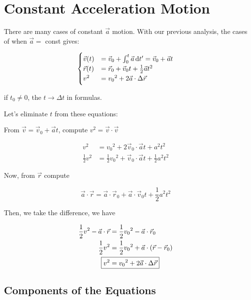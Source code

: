 \section{Constant Acceleration Motion}

There are many cases of constant $\vec a$ motion. With our previous analysis, the cases of when $\vec a =$ const gives:

\begin{equation}
	\begin{cases}
		\vec v(t) &= \vec v_0 + \int_0^t \vec a \D t' = \vec v_0 + \vec a t\\
		\vec r(t) &= \vec r_0 + \vec v_0 t + \frac{1}{2} \vec a t^2\\
		v^2 &= {v_0}^2 + 2 \vec a \cdot \Delta \vec r
	\end{cases}
\end{equation}

\begin{remark}
	if $t_0 \neq 0$, the $t \to \Delta t$ in formulas.
\end{remark}

Let's eliminate $t$ from these equations:

From $\vec v = \vec v_0 + \vec a t$, compute $v^2 = \vec v \cdot \vec v$

\begin{align}
	v^2 &= {v_0}^2 + 2 \vec v_0 \cdot \vec a t + a^2t^2\\
	\frac{1}{2} v^2 &= \frac{1}{2} {v_0}^2 + \vec v_0 \cdot \vec a t + \frac{1}{2}a^2t^2
\end{align}

Now, from $\vec r$ compute

\begin{equation}
	\vec a \cdot \vec r = \vec a \cdot \vec r_0 + \vec a \cdot \vec v_0 t + \frac{1}{2} a^2 t^2
\end{equation}

Then, we take the difference, we have

\begin{align}
	\frac{1}{2} v^2 - \vec a \cdot \vec r &= \frac{1}{2} {v_0}^2 - \vec a \cdot \vec r_0\\
	\frac{1}{2} v^2 &= \frac{1}{2} {v_0}^2 + \vec a \cdot (\vec r - \vec r_0)\\
	\Aboxed{v^2 &= {v_0}^2 + 2 \vec a \cdot \Delta \vec r}
\end{align}

\subsection{Components of the Equations}


